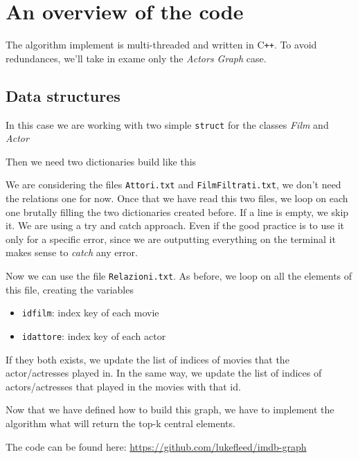 \section{An overview of the code}
The algorithm implement is multi-threaded and written in C\texttt{++}. To avoid redundances, we'll take in exame only the \emph{Actors Graph} case.

\subsection{Data structures}
In this case we are working with two simple \texttt{struct} for the classes \emph{Film} and \emph{Actor}


\s
\nd Then we need two dictionaries build like this


\s
\nd We are considering the files \texttt{Attori.txt} and \texttt{FilmFiltrati.txt}, we don't need the relations one for now. Once that we have read this two files, we loop on each one brutally filling the two dictionaries created before. If a line is empty, we skip it. We are using a try and catch approach. Even if the good practice is to use it only for a specific error, since we are outputting everything on the terminal it makes sense to \emph{catch} any error.


\s

Now we can use the file \texttt{Relazioni.txt}. As before, we loop on all the elements of this file, creating the variables

\begin{itemize}
    \item \texttt{id\textunderscore film}: index key of each movie
    \item \texttt{id\textunderscore attore}: index key of each actor
\end{itemize}

\nd If they both exists, we update the list of indices of movies that the actor/actresses played in. In the same way, we update the list of indices of actors/actresses that played in the movies with that id.


\s
Now that we have defined how to build this graph, we have to implement the algorithm what will return the top-k central elements. \s

\nd The code can be found here: \url{https://github.com/lukefleed/imdb-graph}
\s
\begin{center}
\end{center}

